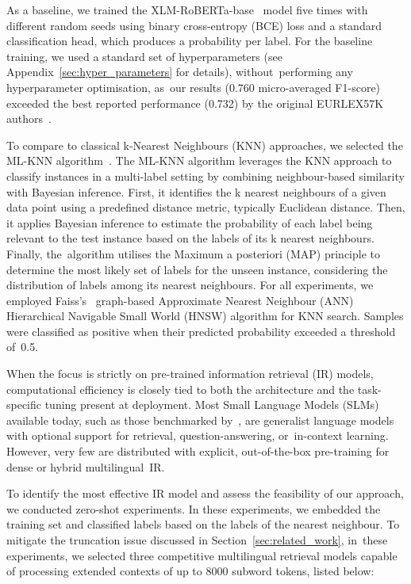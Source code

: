\documentclass[make,article,accept,pdftex,moreauthors]{Definitions/mdpi}
\begin{document}
As a baseline, we trained the XLM-RoBERTa-base~\citep{conneau2019xlmr} model five times with different random seeds using binary cross-entropy (BCE) loss and a standard classification head, which produces a probability per label.
For the baseline training, we used a standard set of hyperparameters (see Appendix~\ref{sec:hyper_parameters} for details), without~performing any hyperparameter optimisation, as~our results (0.760 micro-averaged F1-score) exceeded the best reported performance (0.732) by the original EURLEX57K authors~\citep{chalkidis-etal-2019-large}.

To compare to classical k-Nearest Neighbours (KNN) approaches, we selected the ML-KNN algorithm~\citep{zhang2007mlknn}. 
The ML-KNN algorithm leverages the KNN approach to classify instances in a multi-label setting by combining neighbour-based similarity with Bayesian inference. 
First, it identifies the k nearest neighbours of a given data point using a predefined distance metric, typically Euclidean distance. 
Then, it applies Bayesian inference to estimate the probability of each label being relevant to the test instance based on the labels of its k nearest neighbours. 
Finally, the~algorithm utilises the Maximum a posteriori (MAP) principle to determine the most likely set of labels for the unseen instance, considering the distribution of labels among its nearest neighbours. 
For all experiments, we employed Faiss's~\citep{johnson2019billion,douze2024faiss} graph-based Approximate Nearest Neighbour (ANN) Hierarchical Navigable Small World (HNSW) algorithm for KNN search.
Samples were classified as positive when their predicted probability exceeded a threshold of~0.5.

When the focus is strictly on pre-trained information retrieval (IR) models, computational efficiency is closely tied to both the architecture and the task-specific tuning present at deployment. 
Most Small Language Models (SLMs) available today, such as those benchmarked by~\citep{lu2025smalllanguagemodelssurvey}, are generalist language models with optional support for retrieval, question-answering, or~in-context learning. 
However, very few are distributed with explicit, out-of-the-box pre-training for dense or hybrid multilingual~IR.

To identify the most effective IR model and assess the feasibility of our approach, we conducted zero-shot experiments. 
In these experiments, we embedded the training set and classified labels based on the labels of the nearest neighbour. 
To mitigate the truncation issue discussed in Section~\ref{sec:related_work}, in~these experiments, we selected three competitive multilingual retrieval models capable of processing extended contexts of up to 8000 subword tokens, listed below:
\end{document}
